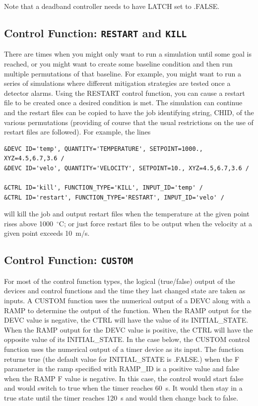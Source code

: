 \documentclass[11pt]{book}
\begin{document}
Note that a deadband controller needs to have {\ct LATCH} set to {\ct .FALSE.}


\subsection{Control Function: \texorpdfstring{{\tt RESTART} and {\tt KILL}} {RESTARTKILL} }

There are times when you might only want to run a simulation until some goal is reached, or you might want to create some baseline condition and then run multiple permutations of that baseline. For example, you might want to run a series of simulations where different mitigation strategies are tested once a detector alarms. Using the {\ct RESTART} control function, you can cause a restart file to be created once a desired condition is met.  The simulation can continue and the restart files can be copied to have the job identifying string, {\ct CHID}, of the various permutations (providing of course that the usual restrictions on the use of restart files are followed). For example, the lines
\begin{lstlisting}
&DEVC ID='temp', QUANTITY='TEMPERATURE', SETPOINT=1000., XYZ=4.5,6.7,3.6 /
&DEVC ID='velo', QUANTITY='VELOCITY', SETPOINT=10., XYZ=4.5,6.7,3.6 /

&CTRL ID='kill', FUNCTION_TYPE='KILL', INPUT_ID='temp' /
&CTRL ID='restart', FUNCTION_TYPE='RESTART', INPUT_ID='velo' /
\end{lstlisting}
will kill the job and output restart files when the temperature at the given point rises above 1000~$^\circ$C; or just force restart files to be output when the velocity at a given point exceeds 10~m/s.



\subsection{Control Function: \texorpdfstring{{\tt CUSTOM}}{CUSTOM} }
\label{info:CUSTOM}

For most of the control function types, the logical (true/false) output of the devices and control functions and the time they last changed state are taken as inputs.  A {\ct CUSTOM} function uses the numerical output of a {\ct DEVC} along with a {\ct RAMP} to determine the output of the function.  When the {\ct RAMP} output for the {\ct DEVC} value is negative, the {\ct CTRL} will have the value of its {\ct INITIAL\_STATE}.  When the {\ct RAMP} output for the {\ct DEVC} value is positive, the {\ct CTRL} will have the opposite value of its {\ct INITIAL\_STATE}. In the case below, the {\ct CUSTOM} control function uses the numerical output of a timer device as its input.  The function returns true (the default value for {\ct INITIAL\_STATE} is {\ct .FALSE.}) when the {\ct F} parameter in the ramp specified with {\ct RAMP\_ID} is a positive value and false when the {\ct RAMP} {\ct F} value is negative. In this case, the control would start false and would switch to true when the timer reaches 60~s.  It would then stay in a true state until the timer reaches 120~s and would then change back to false.
\end{document}
